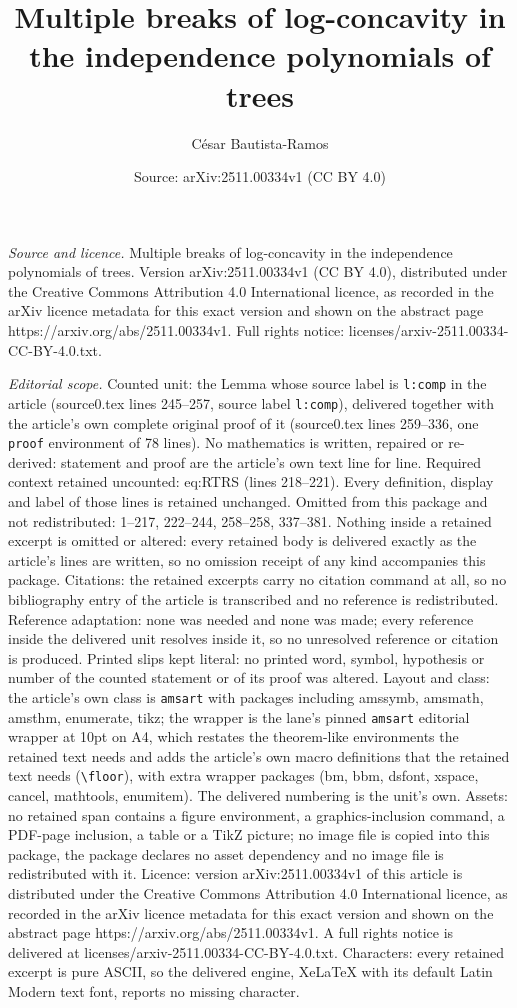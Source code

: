 \documentclass[10pt,a4paper]{amsart}
\title[Multiple breaks of log-concavity in the independence polynom]{Multiple breaks of log-concavity in the independence polynomials of trees}
\author{C\'esar Bautista-Ramos}
\date{Source: arXiv:2511.00334v1 (CC BY 4.0)}
\begin{document}
\maketitle

\noindent\emph{Source and licence.} Multiple breaks of log-concavity in the independence polynomials of trees. Version arXiv:2511.00334v1 (CC BY 4.0), distributed under the Creative Commons Attribution 4.0 International licence, as recorded in the arXiv licence metadata for this exact version and shown on the abstract page https://arxiv.org/abs/2511.00334v1. Full rights notice: licenses/arxiv-2511.00334-CC-BY-4.0.txt.\par\smallskip

\noindent\textit{Editorial scope.} Counted unit: the Lemma whose source label is \texttt{l:comp} in the article (source0.tex lines 245--257, source label \texttt{l:comp}), delivered together with the article's own complete original proof of it (source0.tex lines 259--336, one \texttt{proof} environment of 78 lines). No mathematics is written, repaired or re-derived: statement and proof are the article's own text line for line. Required context retained uncounted: eq:RTRS (lines 218--221). Every definition, display and label of those lines is retained unchanged. Omitted from this package and not redistributed: 1--217, 222--244, 258--258, 337--381. Nothing inside a retained excerpt is omitted or altered: every retained body is delivered exactly as the article's lines are written, so no omission receipt of any kind accompanies this package. Citations: the retained excerpts carry no citation command at all, so no bibliography entry of the article is transcribed and no reference is redistributed. Reference adaptation: none was needed and none was made; every reference inside the delivered unit resolves inside it, so no unresolved reference or citation is produced. Printed slips kept literal: no printed word, symbol, hypothesis or number of the counted statement or of its proof was altered. Layout and class: the article's own class is \texttt{amsart} with packages including amssymb, amsmath, amsthm, enumerate, tikz; the wrapper is the lane's pinned \texttt{amsart} editorial wrapper at 10pt on A4, which restates the theorem-like environments the retained text needs and adds the article's own macro definitions that the retained text needs (\texttt{\textbackslash floor}), with extra wrapper packages (bm, bbm, dsfont, xspace, cancel, mathtools, enumitem). The delivered numbering is the unit's own. Assets: no retained span contains a figure environment, a graphics-inclusion command, a PDF-page inclusion, a table or a TikZ picture; no image file is copied into this package, the package declares no asset dependency and no image file is redistributed with it. Licence: version arXiv:2511.00334v1 of this article is distributed under the Creative Commons Attribution 4.0 International licence, as recorded in the arXiv licence metadata for this exact version and shown on the abstract page https://arxiv.org/abs/2511.00334v1. A full rights notice is delivered at licenses/arxiv-2511.00334-CC-BY-4.0.txt. Characters: every retained excerpt is pure ASCII, so the delivered engine, XeLaTeX with its default Latin Modern text font, reports no missing character.
\end{document}
